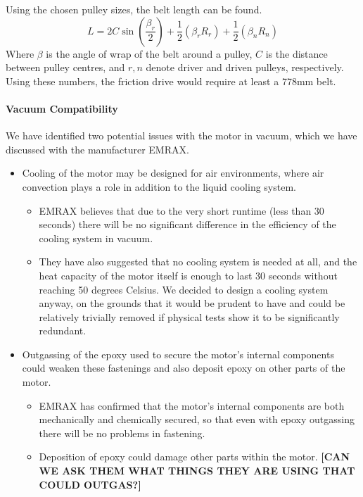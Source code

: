 \documentclass[main.tex]{subfiles}
\begin{document}
Using the chosen pulley sizes, the belt length can be found.
\begin{equation}
L = 2C\sin{(\frac{\beta_r}{2})}+{\frac{1}{2}}(\beta_rR_r)+{\frac{1}{2}}(\beta_nR_n)
\end{equation}
Where $\beta$ is the angle of wrap of the belt around a pulley, $C$ is the distance between pulley centres, and $r,n$ denote driver and driven pulleys, respectively.
Using these numbers, the friction drive would require at least a 778mm belt.

    \paragraph{Vacuum Compatibility}
    We have identified two potential issues with the motor in vacuum, which we have discussed with the manufacturer EMRAX.
    \begin{itemize}
        \item Cooling of the motor may be designed for air environments, where air convection plays a role in addition to the liquid cooling system.
        \begin{itemize}
            \item EMRAX believes that due to the very short runtime (less than 30 seconds) there will be no significant difference in the efficiency of the cooling system in vacuum.
            \item They have also suggested that no cooling system is needed at all, and the heat capacity of the motor itself is enough to last 30 seconds without reaching 50 degrees Celsius. We decided to design a cooling system anyway, on the grounds that it would be prudent to have and could be relatively trivially removed if physical tests show it to be significantly redundant.
        \end{itemize}
        \item Outgassing of the epoxy used to secure the motor’s internal components could weaken these fastenings and also deposit epoxy on other parts of the motor.
        \begin{itemize}
            \item EMRAX has confirmed that the motor’s internal components are both mechanically and chemically secured, so that even with epoxy outgassing there will be no problems in fastening.
            \item Deposition of epoxy could damage other parts within the motor. \textbf{[CAN WE ASK THEM WHAT THINGS THEY ARE USING THAT COULD OUTGAS?]}
        \end{itemize}
    \end{itemize}
\end{document}

